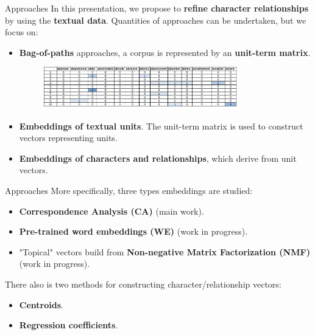 \documentclass[10pt]{beamer}
\newcommand{\imp}[1]{\textbf{\color{cyan}#1}}
\begin{document}
	
	
	\begin{frame}{Approaches}
		In this presentation, we propose to \imp{refine character relationships} by using the \imp{textual data}. Quantities of approaches can be undertaken, but we focus on:
		\begin{itemize}
			\item \imp{Bag-of-paths} approaches, a corpus is represented by an \imp{unit-term matrix}. \\
			\vspace{0.3cm}
			\begin{figure}
				\centering
				\includegraphics[width=0.8\textwidth]{img/unit_term.png}
			\end{figure}
			\item \imp{Embeddings of textual units}. The unit-term matrix is used to construct vectors representing units. 
			\item \imp{Embeddings of characters and relationships}, which derive from unit vectors.
		\end{itemize}
	\end{frame}
	
	
	
	\begin{frame}{Approaches}
		More specifically, three types embeddings are studied:
		\begin{itemize}
			\item \imp{Correspondence Analysis (CA)} (main work).
			\item \imp{Pre-trained word embeddings (WE)} (work in progress).
			\item "Topical" vectors build from \imp{Non-negative Matrix Factorization (NMF)} (work in progress).
		\end{itemize}
		There also is two methods for constructing character/relationship vectors:
		\begin{itemize}
			\item \imp{Centroids}.
			\item \imp{Regression coefficients}.
		\end{itemize}
	\end{frame}
	
\end{document}
